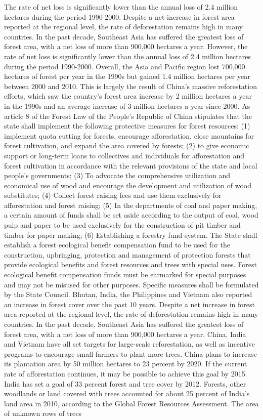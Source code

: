 \documentclass{book}\usepackage{knitr}
\begin{document}
	The rate of net loss is significantly lower than the annual loss of 2.4 million hectares during the period 1990-2000. Despite a net increase in forest area reported at the regional level, the rate of deforestation remains high in many countries. In the past decade, Southeast Asia has suffered the greatest loss of forest area, with a net loss of more than 900,000 hectares a year. However, the rate of net loss is significantly lower than the annual loss of 2.4 million hectares during the period 1990-2000. Overall, the Asia and Pacific region lost 700,000 hectares of forest per year in the 1990s but gained 1.4 million hectares per year between 2000 and 2010. This is largely the result of China's massive reforestation efforts, which saw the country's forest area increase by 2 million hectares a year in the 1990s and an average increase of 3 million hectares a year since 2000. As article 8 of the Forest Law of the People's Republic of China stipulates that the state shall implement the following protective measures for forest resources: (1) implement quota cutting for forests, encourage afforestation, close mountains for forest cultivation, and expand the area covered by forests; (2) to give economic support or long-term loans to collectives and individuals for afforestation and forest cultivation in accordance with the relevant provisions of the state and local people's governments; (3) To advocate the comprehensive utilization and economical use of wood and encourage the development and utilization of wood substitutes; (4) Collect forest raising fees and use them exclusively for afforestation and forest raising; (5) In the departments of coal and paper making, a certain amount of funds shall be set aside according to the output of coal, wood pulp and paper to be used exclusively for the construction of pit timber and timber for paper making; (6) Establishing a forestry fund system. The State shall establish a forest ecological benefit compensation fund to be used for the construction, upbringing, protection and management of protection forests that provide ecological benefits and forest resources and trees with special uses. Forest ecological benefit compensation funds must be earmarked for special purposes and may not be misused for other purposes. Specific measures shall be formulated by the State Council. Bhutan, India, the Philippines and Vietnam also reported an increase in forest cover over the past 10 years. Despite a net increase in forest area reported at the regional level, the rate of deforestation remains high in many countries. In the past decade, Southeast Asia has suffered the greatest loss of forest area, with a net loss of more than 900,000 hectares a year. China, India and Vietnam have all set targets for large-scale reforestation, as well as incentive programs to encourage small farmers to plant more trees. China plans to increase its plantation area by 50 million hectares to 23 percent by 2020. If the current rate of afforestation continues, it may be possible to achieve this goal by 2015. India has set a goal of 33 percent forest and tree cover by 2012. Forests, other woodlands or land covered with trees accounted for about 25 percent of India's land area in 2010, according to the Global Forest Resources Assessment. The area of unknown rows of trees 
\end{document}

